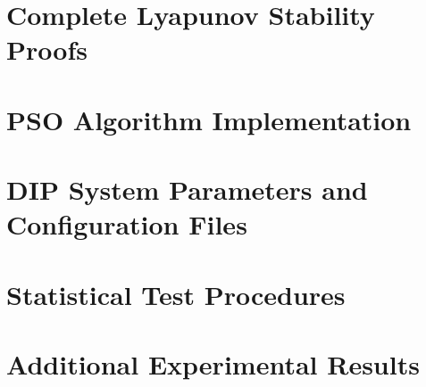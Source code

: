 \documentclass[12pt,a4paper,oneside]{report}
\begin{document}
\begin{appendices}

\chapter{Complete Lyapunov Stability Proofs}
\label{app:lyapunov_proofs}


\chapter{PSO Algorithm Implementation}
\label{app:pso_implementation}


\chapter{DIP System Parameters and Configuration Files}
\label{app:dip_parameters}


\chapter{Statistical Test Procedures}
\label{app:statistical_procedures}


\chapter{Additional Experimental Results}
\label{app:additional_results}


\end{appendices}
\end{document}

